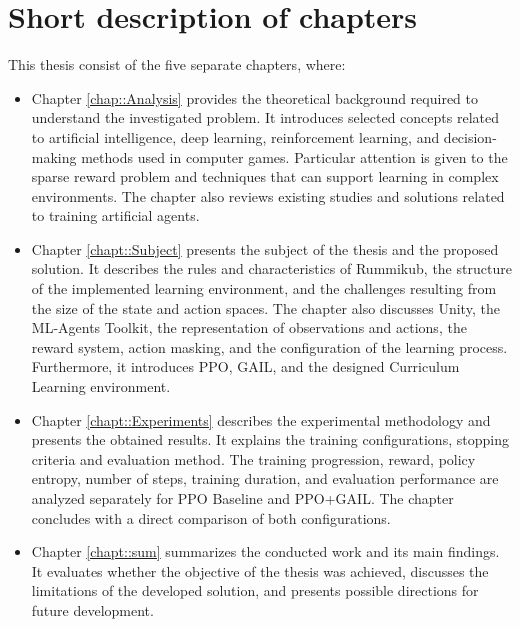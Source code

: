 \section{Short description of chapters}
This thesis consist of the five separate chapters, where:
\begin{itemize}
	\item Chapter \ref{chap::Analysis} provides the theoretical background required to understand the investigated problem. It introduces selected concepts related to artificial intelligence, deep learning, reinforcement learning, and decision-making methods used in computer games. Particular attention is given to the sparse reward problem and techniques that can support learning in complex environments. The chapter also reviews existing studies and solutions related to training artificial agents.
	\item Chapter \ref{chapt::Subject} presents the subject of the thesis and the proposed solution. It describes the rules and characteristics of Rummikub, the structure of the implemented learning environment, and the challenges resulting from the size of the state and action spaces. The chapter also discusses Unity, the ML-Agents Toolkit, the representation of observations and actions, the reward system, action masking, and the configuration of the learning process. Furthermore, it introduces PPO, GAIL, and the designed Curriculum Learning environment.
	\item Chapter \ref{chapt::Experiments} describes the experimental methodology and presents the obtained results. It explains the training configurations, stopping criteria and evaluation method. The training progression, reward, policy entropy, number of steps, training duration, and evaluation performance are analyzed separately for PPO Baseline and PPO+GAIL. The chapter concludes with a direct comparison of both configurations.
	\item Chapter \ref{chapt::sum} summarizes the conducted work and its main findings. It evaluates whether the objective of the thesis was achieved, discusses the limitations of the developed solution, and presents possible directions for future development.
\end{itemize}


